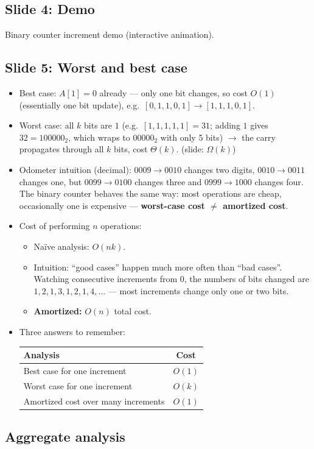 \documentclass[11pt]{article}
\newcommand{\slide}[2]{\subsection*{Slide #1: #2}}
\begin{document}
\slide{4}{Demo}
Binary counter increment demo (interactive animation).

\slide{5}{Worst and best case}
\begin{itemize}
  \item Best case: $A[1] = 0$ already --- only one bit changes, so cost $O(1)$ (essentially one bit update), e.g.\ $[0,1,1,0,1] \to [1,1,1,0,1]$.
  \item Worst case: all $k$ bits are $1$ (e.g.\ $[1,1,1,1,1] = 31$; adding $1$ gives $32 = 100000_2$, which wraps to $00000_2$ with only 5 bits) $\to$ the carry propagates through all $k$ bits, cost $\Theta(k)$. \hfill (slide: $\Omega(k)$)
  \item Odometer intuition (decimal): $0009 \to 0010$ changes two digits, $0010 \to 0011$ changes one, but $0099 \to 0100$ changes three and $0999 \to 1000$ changes four. The binary counter behaves the same way: most operations are cheap, occasionally one is expensive --- \textbf{worst-case cost $\ne$ amortized cost}.
  \item Cost of performing $n$ operations:
  \begin{itemize}
    \item Na\"ive analysis: $O(nk)$.
    \item Intuition: ``good cases'' happen much more often than ``bad cases''. Watching consecutive increments from $0$, the numbers of bits changed are $1,2,1,3,1,2,1,4,\ldots$ --- most increments change only one or two bits.
    \item \textbf{Amortized:} $O(n)$ total cost.
  \end{itemize}
  \item Three answers to remember:
        \begin{center}
        \begin{tabular}{lc}
          \hline
          Analysis & Cost \\
          \hline
          Best case for one increment & $O(1)$ \\
          Worst case for one increment & $O(k)$ \\
          Amortized cost over many increments & $O(1)$ \\
          \hline
        \end{tabular}
        \end{center}
\end{itemize}

\subsection*{Aggregate analysis}
\end{document}
